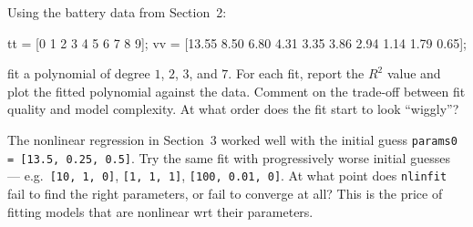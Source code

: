 \documentclass[../../book.tex]{subfiles}
\begin{document}
\begin{ex}\label{ex:overfit}
Using the battery data from Section~2:
\begin{code}
tt = [0 1 2 3 4 5 6 7 8 9];
vv = [13.55 8.50 6.80 4.31 3.35 3.86 2.94 1.14 1.79 0.65];
\end{code}
\noindent fit a polynomial of degree $1$, $2$, $3$, and $7$.  For each fit, report the $R^2$ value and plot the fitted polynomial against the data.  Comment on the trade-off between fit quality and model complexity.  At what order does the fit start to look ``wiggly''?
\end{ex}

\begin{ex}\label{ex:nlin_starting_point}
The nonlinear regression in Section~3 worked well with the initial guess \lstinline{params0 = [13.5, 0.25, 0.5]}.  Try the same fit with progressively worse initial guesses --- e.g.\ \lstinline{[10, 1, 0]}, \lstinline{[1, 1, 1]}, \lstinline{[100, 0.01, 0]}.  At what point does \lstinline{nlinfit} fail to find the right parameters, or fail to converge at all?  This is the price of fitting models that are nonlinear wrt their parameters.
\end{ex}
\end{document}
